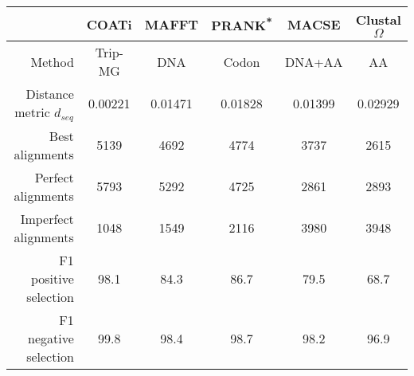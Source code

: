 \newcommand*\pct{\scalebox{.9}{\%}}

\begingroup\centering
\setlength{\tabcolsep}{4pt}
\begin{tabular}{r|ccccc}
      & \textbf{COATi} & \textbf{MAFFT} & \textbf{PRANK\textsuperscript{*}} & \textbf{MACSE} & \textbf{Clustal$\Omega$}\\
\hline
Method    & Trip-MG & DNA & Codon & DNA+AA & AA\\[2pt]
Distance metric $d_{seq}$ & \cellcolor{bestcolor}0.00221 & 0.01471 & 0.01828 & 0.01399 & 0.02929\\
Best alignments & \cellcolor{bestcolor}5139 & 4692 & 4774 & 3737 & 2615\\
Perfect alignments & \cellcolor{bestcolor}5793 & 5292 & 4725 & 2861 & 2893\\
Imperfect alignments & \cellcolor{bestcolor}1048 & 1549 & 2116 & 3980 & 3948\\
F1 positive selection & \cellcolor{bestcolor}98.1\pct & 84.3\pct & 86.7\pct & 79.5\pct & 68.7\pct \\
F1 negative selection & \cellcolor{bestcolor}99.8\pct & 98.4\pct & 98.7\pct & 98.2\pct & 96.9\pct
\end{tabular}
\par\endgroup

